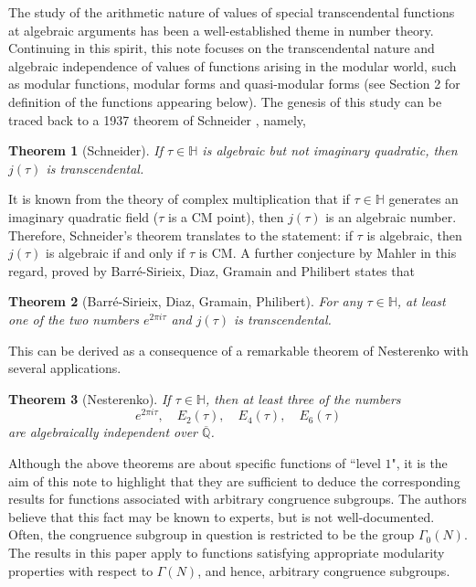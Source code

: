 \documentclass[11pt, reqno]{amsart}
\newtheorem{theorem}{Theorem}[section]
\begin{document}
The study of the arithmetic nature of values of special transcendental functions at algebraic arguments has been a well-established theme in number theory. Continuing in this spirit, this note focuses on the transcendental nature and algebraic independence of values of functions arising in the modular world, such as modular functions, modular forms and quasi-modular forms (see Section 2 for definition of the functions appearing below). The genesis of this study can be traced back to a 1937 theorem of Schneider \cite{schneider}, namely,
\begin{theorem}[Schneider]\label{schneider}
    If $\tau\in \mathbb{H}$ is algebraic but not imaginary quadratic, then $j(\tau)$ is transcendental.
\end{theorem}
It is known from the theory of complex multiplication that if $\tau\in\mathbb{H}$ generates an imaginary quadratic field ($\tau$ is a CM point), then $j(\tau)$ is an algebraic number. Therefore, Schneider's theorem translates to the statement: if $\tau$ is algebraic, then $j(\tau)$ is algebraic if and only if $\tau$ is CM. A further conjecture by Mahler \cite{mahler} in this regard, proved by Barr\'e-Sirieix, Diaz, Gramain and Philibert \cite{b-d-g-p} states that
\begin{theorem}[Barr\'e-Sirieix, Diaz, Gramain, Philibert]\label{mahl}
For any $\tau\in \mathbb{H}$, at least one of the two numbers $e^{2\pi i\tau}$ and $j(\tau)$ is transcendental.
\end{theorem}
This can be derived as a consequence of a remarkable theorem of Nesterenko \cite{nesterenko} with several applications.
\begin{theorem}[Nesterenko] \label{nest}
If $\tau\in \mathbb{H}$, then at least three of the numbers
$$
e^{2 \pi i \tau},\quad E_2(\tau),\quad E_4(\tau),\quad E_6(\tau)
$$
are algebraically independent over $\overline{\mathbb{Q}}$.
\end{theorem}

Although the above theorems are about specific functions of ``level $1$", it is the aim of this note to highlight that they are sufficient to deduce the corresponding results for functions associated with arbitrary congruence subgroups. The authors believe that this fact may be known to experts, but is not well-documented. Often, the congruence subgroup in question is restricted to be the group $\Gamma_0(N)$. The results in this paper apply to functions satisfying appropriate modularity properties with respect to $\Gamma(N)$, and hence, arbitrary congruence subgroups.\\
\end{document}
